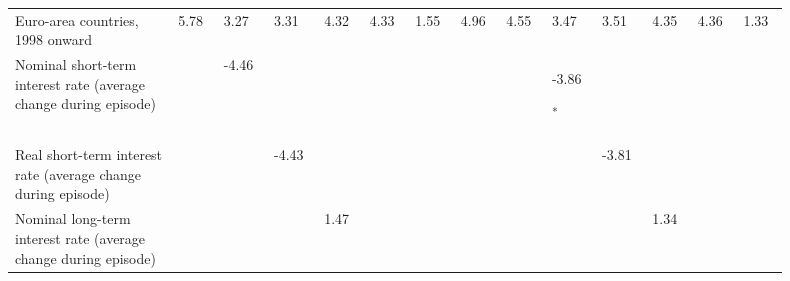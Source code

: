 \begin{table}[!htbp]
\begin{threeparttable}
\begin{tabular}{@{}>{\raggedright\arraybackslash}p{0.18\linewidth}*{13}{>{\centering\arraybackslash}p{0.055\linewidth}}@{}}
Euro-area countries, 1998 onward & \makecell[c]{\rule{0pt}{2.6ex} 5.78 \\ \rule{0pt}{2.0ex} \phantom{\textsuperscript{***}}} & \makecell[c]{\rule{0pt}{2.6ex} 3.27 \\ \rule{0pt}{2.0ex} \phantom{\textsuperscript{***}}} & \makecell[c]{\rule{0pt}{2.6ex} 3.31 \\ \rule{0pt}{2.0ex} \phantom{\textsuperscript{***}}} & \makecell[c]{\rule{0pt}{2.6ex} 4.32 \\ \rule{0pt}{2.0ex} \phantom{\textsuperscript{***}}} & \makecell[c]{\rule{0pt}{2.6ex} 4.33 \\ \rule{0pt}{2.0ex} \phantom{\textsuperscript{***}}} & \makecell[c]{\rule{0pt}{2.6ex} 1.55 \\ \rule{0pt}{2.0ex} \phantom{\textsuperscript{***}}} & \makecell[c]{\rule{0pt}{2.6ex} 4.96 \\ \rule{0pt}{2.0ex} \phantom{\textsuperscript{***}}} & \makecell[c]{\rule{0pt}{2.6ex} 4.55 \\ \rule{0pt}{2.0ex} \phantom{\textsuperscript{***}}} & \makecell[c]{\rule{0pt}{2.6ex} 3.47 \\ \rule{0pt}{2.0ex} \phantom{\textsuperscript{***}}} & \makecell[c]{\rule{0pt}{2.6ex} 3.51 \\ \rule{0pt}{2.0ex} \phantom{\textsuperscript{***}}} & \makecell[c]{\rule{0pt}{2.6ex} 4.35 \\ \rule{0pt}{2.0ex} \phantom{\textsuperscript{***}}} & \makecell[c]{\rule{0pt}{2.6ex} 4.36 \\ \rule{0pt}{2.0ex} \phantom{\textsuperscript{***}}} & \makecell[c]{\rule{0pt}{2.6ex} 1.33 \\ \rule{0pt}{2.0ex} \phantom{\textsuperscript{***}}} \\
Nominal short-term interest rate (average change during episode) &  & \makecell[c]{\rule{0pt}{2.6ex} -4.46 \\ \rule{0pt}{2.0ex} \phantom{\textsuperscript{***}}} &  &  &  &  &  &  & \makecell[c]{\rule{0pt}{2.6ex} -3.86 \\ \rule{0pt}{2.0ex} \textsuperscript{*}} &  &  &  &  \\
Real short-term interest rate (average change during episode) &  &  & \makecell[c]{\rule{0pt}{2.6ex} -4.43 \\ \rule{0pt}{2.0ex} \phantom{\textsuperscript{***}}} &  &  &  &  &  &  & \makecell[c]{\rule{0pt}{2.6ex} -3.81 \\ \rule{0pt}{2.0ex} \phantom{\textsuperscript{***}}} &  &  &  \\
Nominal long-term interest rate (average change during episode) &  &  &  & \makecell[c]{\rule{0pt}{2.6ex} 1.47 \\ \rule{0pt}{2.0ex} \phantom{\textsuperscript{***}}} &  &  &  &  &  &  & \makecell[c]{\rule{0pt}{2.6ex} 1.34 \\ \rule{0pt}{2.0ex} \phantom{\textsuperscript{***}}} &  &  \\

\end{tabular}
\end{threeparttable}
\end{table}
